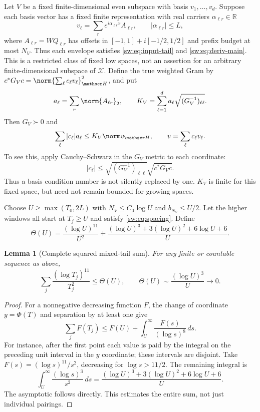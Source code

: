 \documentclass[11pt,a4paper]{article}
\numberwithin{equation}{section}
\newtheorem{lemma}[theorem]{Lemma}
\theoremstyle{definition}\newtheorem{definition}[theorem]{Definition}
\theoremstyle{remark}\newtheorem{remark}[theorem]{Remark}
\begin{document}
Let $V$ be a fixed finite-dimensional even subspace with basis
$v_1,\ldots,v_d$. Suppose each basis vector has a fixed finite representation with real
carriers $\alpha_{\ell r}\in\mathbb R$
\begin{equation}\label{ls:eq:low-decomp}
 v_\ell=\sum_r e^{i\alpha_{\ell r}x}A_{\ell r},\qquad
 |\alpha_{\ell r}|\le L,
\end{equation}
where $A_{\ell r}=WQ_{\ell r}$ has offsets in
$[-1,1]+i[-1/2,1/2]$ and prefix budget at most $N_V$.
Thus each envelope satisfies \eqref{sw:eq:input-tail} and
\eqref{sw:eq:deriv-main}. This is a restricted class of fixed low
spaces, not an assertion for an arbitrary finite-dimensional subspace of
$\mathscr X$.
Define the true weighted Gram by
$c^*G_Vc=\norm{\sum_\ell c_\ell v_\ell}_{\mathscr H}^2$, and put
\begin{equation}\label{ls:eq:KV}
 a_\ell=\sum_r\norm{A_{\ell r}}_2,\qquad
 K_V=\sum_{\ell=1}^d a_\ell\sqrt{(G_V^{-1})_{\ell\ell}}.
\end{equation}
Then $G_V\succ0$ and
\begin{equation}\label{ls:eq:coordinate}
 \sum_\ell |c_\ell|a_\ell\le K_V\norm v_{\mathscr H},
 \qquad v=\sum_\ell c_\ell v_\ell.
\end{equation}
To see this, apply Cauchy--Schwarz in the $G_V$ metric to each coordinate:
\[
|c_\ell|\le\sqrt{(G_V^{-1})_{\ell\ell}}\sqrt{c^*G_Vc}.
\]
Thus a basis condition number is not silently replaced by one. $K_V$ is
finite for this fixed space, but need not remain bounded for growing spaces.

Choose $U\ge\max(T_0,2L)$ with $N_V\le C_0\log U$ and
$b_{N_V}\le U/2$. Let the higher windows all start at $T_j\ge U$ and
satisfy \eqref{sw:eq:spacing}. Define
\begin{equation}\label{ls:eq:theta}
 \Theta(U)=\frac{(\log U)^{11}}{U^2}
 +\frac{(\log U)^3+3(\log U)^2+6\log U+6}{U}.
\end{equation}

\begin{lemma}[Complete squared mixed-tail sum]\label{ls:lem:packing}
For any finite or countable sequence as above,
\begin{equation}\label{ls:eq:pack-sum}
 \sum_j\frac{(\log T_j)^{11}}{T_j^2}\le\Theta(U),
 \qquad \Theta(U)\sim\frac{(\log U)^3}{U}\longrightarrow0.
\end{equation}
\end{lemma}
\begin{proof}
For a nonnegative decreasing function $F$, the change of coordinate
$y=\Phi(T)$ and separation by at least one give
\[
 \sum_j F(T_j)\le F(U)+\int_U^\infty
                    \frac{F(s)}{(\log s)^8}\,ds.
\]
For instance, after the first point each value is paid by the integral on
the preceding unit interval in the $y$ coordinate; these intervals are
disjoint. Take $F(s)=(\log s)^{11}/s^2$, decreasing for $\log s>11/2$.
The remaining integral is
\[
 \int_U^\infty\frac{(\log s)^3}{s^2}\,ds
 =\frac{(\log U)^3+3(\log U)^2+6\log U+6}{U}.
\]
The asymptotic follows directly. This estimates the entire sum, not just
individual pairings.
\end{proof}
\end{document}
